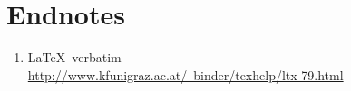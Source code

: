 
\clearpage
\newpage
\setcounter{secnumdepth}{0}
\section{Endnotes}

\begin{enumerate}

\item \LaTeX\ verbatim\\
\href{http://www.kfunigraz.ac.at/~binder/texhelp/ltx-79.html}
{http://www.kfunigraz.ac.at/~binder/texhelp/ltx-79.html}

\end{enumerate}
